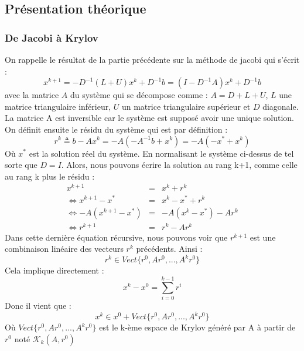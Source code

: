 \subsection{Présentation théorique}
\subsubsection{De Jacobi à Krylov}
On rappelle le résultat de la partie précédente sur la méthode de jacobi qui s'écrit : 
\begin{equation}
x^{k+1} = -D^{-1}(L+U)x^k + D^{-1}b = (I - D^{-1}A)x^{k} + D^{-1}b
\end{equation}
avec la matrice $A$ du système qui se décompose comme : $A = D + L + U$, $L$ une matrice triangulaire inférieur, $U$ un matrice triangulaire supérieur et $D$ diagonale. La matrice A est inversible car le système est supposé avoir une unique solution. On définit ensuite le résidu du système qui est par définition : 
\begin{equation}
r^k \triangleq b - Ax^k = -A ( - A^{-1}b + x^k) = -A (- x^* + x^k)
\end{equation}
Où $x^*$ est la solution réel du système. En normalisant le système ci-dessus de tel sorte que $D = I$. Alors, nous pouvons écrire la solution au rang k+1, comme celle au rang k plus le résidu : 
\begin{eqnarray}
x^{k+1} &=& x^k + r^k\\
\Leftrightarrow x^{k+1} - x^* &=& x^k - x^* + r^k\\
\Leftrightarrow -A( x^{k+1} - x^*) &=& -A(x^k - x^*) - Ar^k\\
\Leftrightarrow r^{k+1} &=& r^k - Ar^k
\end{eqnarray}
Dans cette dernière équation récursive, nous pouvons voir que $r^{k+1}$ est une combinaison linéaire des vecteurs $r^k$ précédents. Ainsi :
\begin{equation}
r^k \in Vect\{r^0, Ar^0, ..., A^kr^0\}
\end{equation}
Cela implique directement : 
\begin{equation}
x^k - x^0 = \sum_{i = 0}^{k-1}r^i
\end{equation}
Donc il vient que : 
\begin{equation}
x^k \in x^0 + Vect\{r^0, Ar^0, ..., A^kr^0\}
\end{equation}
Où $Vect\{r^0, Ar^0, ..., A^kr^0\}$ est le k-ème espace de Krylov généré par A à partir de $r^0$ noté $\mathcal{K}_k(A, r^0)$
